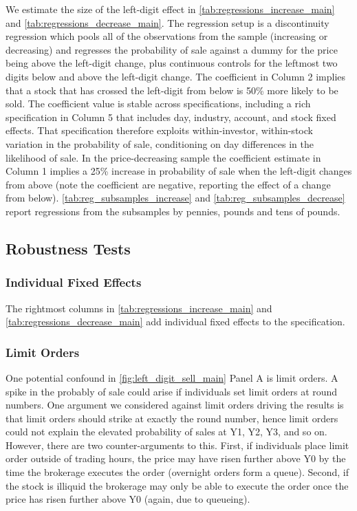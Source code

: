 We estimate the size of the left-digit effect in \ref{tab:regressions_increase_main} and \ref{tab:regressions_decrease_main}. The regression setup is a discontinuity regression which pools all of the observations from the sample (increasing or decreasing) and regresses the probability of sale against a dummy for the price being above the left-digit change, plus continuous controls for the leftmost two digits below and above the left-digit change. The coefficient in Column 2 implies that a stock that has crossed the left-digit from below is 50\% more likely to be sold. The coefficient value is stable across specifications, including a rich specification in Column 5 that includes day, industry, account, and stock fixed effects. That specification therefore exploits within-investor, within-stock variation in the probability of sale, conditioning on day differences in the likelihood of sale. In the price-decreasing sample the coefficient estimate in Column 1 implies a 25\% increase in probability of sale when the left-digit changes from above (note the coefficient are negative, reporting the effect of a change from below). \ref{tab:reg_subsamples_increase} and \ref{tab:reg_subsamples_decrease} report regressions from the subsamples by pennies, pounds and tens of pounds.

\subsection{Robustness Tests}

\subsubsection{Individual Fixed Effects}

The rightmost columns in \ref{tab:regressions_increase_main} and \ref{tab:regressions_decrease_main} add individual fixed effects to the specification.

\subsubsection{Limit Orders}

One potential confound in \ref{fig:left_digit_sell_main} Panel A is limit orders. A spike in the probably of sale could arise if individuals set limit orders at round numbers. One argument we considered against limit orders driving the results is that limit orders should strike at exactly the round number, hence limit orders could not explain the elevated probability of sales at Y1, Y2, Y3, and so on. However, there are two counter-arguments to this. First, if individuals place limit order outside of trading hours, the price may have risen further above Y0 by the time the brokerage executes the order (overnight orders form a queue). Second, if the stock is illiquid the brokerage may only be able to execute the order once the price has risen further above Y0 (again, due to queueing).

